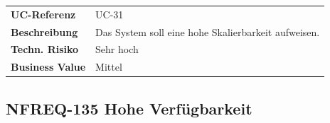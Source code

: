 \begin{longtable}[c]{@{}ll@{}}
\toprule
\begin{minipage}[t]{0.20\columnwidth}\raggedright\strut
\textbf{UC-Referenz}
\strut\end{minipage} &
\begin{minipage}[t]{0.74\columnwidth}\raggedright\strut
UC-31
\strut\end{minipage}\tabularnewline
\begin{minipage}[t]{0.20\columnwidth}\raggedright\strut
\textbf{Beschreibung}
\strut\end{minipage} &
\begin{minipage}[t]{0.74\columnwidth}\raggedright\strut
Das System soll eine hohe Skalierbarkeit aufweisen.
\strut\end{minipage}\tabularnewline
\begin{minipage}[t]{0.20\columnwidth}\raggedright\strut
\textbf{Techn. Risiko}
\strut\end{minipage} &
\begin{minipage}[t]{0.74\columnwidth}\raggedright\strut
Sehr hoch
\strut\end{minipage}\tabularnewline
\begin{minipage}[t]{0.20\columnwidth}\raggedright\strut
\textbf{Business Value}
\strut\end{minipage} &
\begin{minipage}[t]{0.74\columnwidth}\raggedright\strut
Mittel
\strut\end{minipage}\tabularnewline
\bottomrule
\end{longtable}

\subsection{NFREQ-135 Hohe
Verfügbarkeit}\label{nfreq-135-hohe-verfuxfcgbarkeit}

